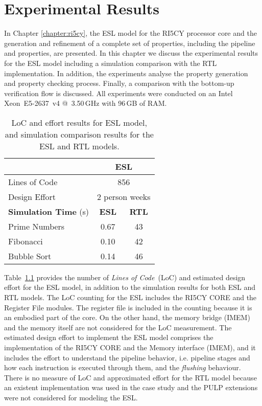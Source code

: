 \chapter{Experimental Results}
\label{chapter:results}


In Chapter \ref{chapter:ri5cy}, the ESL model for the RI5CY processor core and the generation and refinement of a complete set of properties, including the pipeline and \SSQED{} properties, are presented. In this chapter we discuss the experimental results for the ESL model including a simulation comparison with the RTL implementation. In addition, the experiments analyse the property generation and property checking process. Finally, a comparison with the bottom-up verification flow is discussed. All experiments were conducted on an Intel Xeon~E5-2637~v4  @~3.50\,GHz with 96\,GB of RAM.

\begin{table}[htb!] 
	\centering 
	\caption{LoC and effort results for ESL model, and simulation comparison results for the ESL and RTL models.} 
	\label{tab:esl-rtl-comp}
	\begin{tabular}{p{5cm} c c} 
		  &  \multicolumn{2}{c}{\textbf{ESL}} \\     
		\hline	
		Lines of Code  & \multicolumn{2}{c}{856} \\
		Design Effort & \multicolumn{2}{c}{2 person weeks}\\
		\hline
		\textbf{Simulation Time} (s) & \textbf{ESL} & \textbf{RTL}\\
		\hline
		Prime Numbers  &  0.67 & 43 \\
		Fibonacci  &  0.10 & 42 \\
		Bubble Sort  &  0.14 & 46 \\
	\end{tabular} 
\end{table}

Table~\ref{tab:esl-rtl-comp} provides the number of \textit{Lines of Code}~(LoC) and estimated design effort for the ESL model, in addition to the simulation results for both ESL and RTL models. The LoC counting for the ESL includes the RI5CY CORE and the Register File modules. The register file is included in the counting because it is an embodied part of the core. On the other hand, the memory bridge (IMEM) and the memory itself are not considered for the LoC measurement. The estimated design effort to implement the ESL model comprises the implementation of the RI5CY CORE and the Memory interface (IMEM), and it includes the effort to understand the pipeline behavior, i.e. pipeline stages and how each instruction is executed through them, and the \textit{flushing} behaviour. There is no measure of LoC and approximated effort for the RTL model because an existent implementation was used in the case study and the PULP extensions were not considered for modeling the ESL.  


